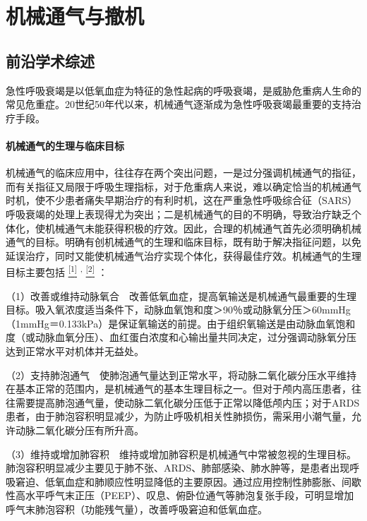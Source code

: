 \chapter{机械通气与撤机}

\section{前沿学术综述}

急性呼吸衰竭是以低氧血症为特征的急性起病的呼吸衰竭，是威胁危重病人生命的常见危重症。20世纪50年代以来，机械通气逐渐成为急性呼吸衰竭最重要的支持治疗手段。

\subsubsection{机械通气的生理与临床目标}

机械通气的临床应用中，往往存在两个突出问题，一是过分强调机械通气的指征，而有关指征又局限于呼吸生理指标，对于危重病人来说，难以确定恰当的机械通气时机，使不少患者痛失早期治疗的有利时机，这在严重急性呼吸综合征（SARS）呼吸衰竭的处理上表现得尤为突出；二是机械通气的目的不明确，导致治疗缺乏个体化，使机械通气未能获得积极的疗效。因此，合理的机械通气首先必须明确机械通气的目标。明确有创机械通气的生理和临床目标，既有助于解决指征问题，以免延误治疗，同时又能使机械通气治疗实现个体化，获得最佳疗效。机械通气的生理目标主要包括
\protect\hyperlink{text00016.htmlux5cux23ch1-15}{\textsuperscript{{[}1{]}}}
\textsuperscript{,}
\protect\hyperlink{text00016.htmlux5cux23ch2-15}{\textsuperscript{{[}2{]}}}
：

（1）改善或维持动脉氧合　改善低氧血症，提高氧输送是机械通气最重要的生理目标。吸入氧浓度适当条件下，动脉血氧饱和度＞90％或动脉氧分压＞60mmHg（1mmHg＝0.133kPa）是保证氧输送的前提。由于组织氧输送是由动脉血氧饱和度（或动脉血氧分压）、血红蛋白浓度和心输出量共同决定，过分强调动脉氧分压达到正常水平对机体并无益处。

（2）支持肺泡通气　使肺泡通气量达到正常水平，将动脉二氧化碳分压水平维持在基本正常的范围内，是机械通气的基本生理目标之一。但对于颅内高压患者，往往需要提高肺泡通气量，使动脉二氧化碳分压低于正常以降低颅内压；对于ARDS患者，由于肺泡容积明显减少，为防止呼吸机相关性肺损伤，需采用小潮气量，允许动脉二氧化碳分压有所升高。

（3）维持或增加肺容积　维持或增加肺容积是机械通气中常被忽视的生理目标。肺泡容积明显减少主要见于肺不张、ARDS、肺部感染、肺水肿等，是患者出现呼吸窘迫、低氧血症和肺顺应性明显降低的主要原因。通过应用控制性肺膨胀、间歇性高水平呼气末正压（PEEP）、叹息、俯卧位通气等肺泡复张手段，可明显增加呼气末肺泡容积（功能残气量），改善呼吸窘迫和低氧血症。

